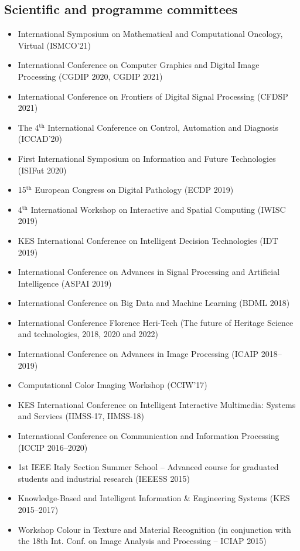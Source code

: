 \documentclass[11pt]{article}
\begin{document}
\subsection*{Scientific and programme committees}

\begin{itemize} 
	\item International Symposium on Mathematical and Computational Oncology, Virtual (ISMCO'21)
	\item International Conference on Computer Graphics and Digital Image Processing (CGDIP 2020, CGDIP 2021)
	\item International Conference on Frontiers of Digital Signal Processing (CFDSP 2021)
  \item The 4$^\text{th}$ International Conference on Control, Automation and Diagnosis (ICCAD'20)
  \item First International Symposium on Information and Future Technologies (ISIFut 2020)
  \item 15$^\text{th}$ European Congress on Digital Pathology (ECDP 2019)
	\item 4$^\text{th}$ International Workshop on Interactive and Spatial Computing (IWISC 2019)
  \item KES International Conference on Intelligent Decision Technologies (IDT 2019)
  \item International Conference on Advances in Signal Processing and Artificial Intelligence (ASPAI 2019)
  \item International Conference on Big Data and Machine Learning (BDML 2018)
  \item International Conference Florence Heri-Tech (The future of Heritage Science and technologies, 2018, 2020 and 2022)
  \item International Conference on Advances in Image Processing (ICAIP 2018--2019)
  \item Computational Color Imaging Workshop (CCIW'17)
	\item KES International Conference on Intelligent Interactive Multimedia: Systems and Services (IIMSS-17, IIMSS-18)
  \item International Conference on Communication and Information Processing (ICCIP 2016--2020)
  \item 1st IEEE Italy Section Summer School – Advanced course for graduated students and industrial research (IEEESS 2015)
  \item Knowledge-Based and Intelligent Information \& Engineering Systems (KES 2015--2017)
  \item Workshop Colour in Texture and Material Recognition (in conjunction with the 18th Int. Conf. on Image Analysis and Processing – ICIAP 2015)

\end{itemize}
\end{document}
